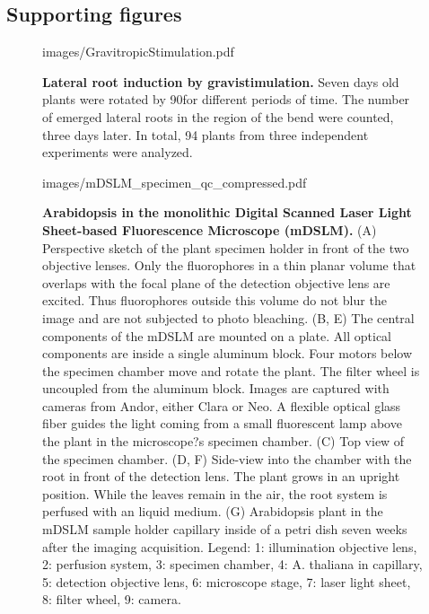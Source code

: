 \documentclass[11pt,a4paper, draft]{article}
\begin{document}
\subsection{Supporting figures}
\setcounter{figure}{0}
\makeatletter 
\renewcommand{\thefigure}{S\@arabic\c@figure}
\makeatother
%
\begin{figure}[htbp]
	\begin{center}
	\begin{overpic}[width=1.\linewidth]{images/GravitropicStimulation.pdf}
	\end{overpic}
\caption[Lateral root induction by gravistimulation.]
{{\bf Lateral root induction by gravistimulation.} Seven days old plants were rotated by 90\degree for different periods of time. The number of emerged lateral roots in the region of the bend were counted, three days later. In total, 94 plants from three independent experiments were analyzed.}
	\label{fig:gravistimul}
	\end{center}
\end{figure}
%
\clearpage
\begin{figure}[htbp]
	\begin{center}
	\begin{overpic}[width=1.\linewidth]{images/mDSLM_specimen_qc_compressed.pdf}
	\end{overpic}
\caption[Arabidopsis in the monolithic Digital Scanned Laser Light Sheet-based Fluorescence Microscope (mDSLM).]
{{\bf Arabidopsis in the monolithic Digital Scanned Laser Light Sheet-based Fluorescence Microscope (mDSLM).} 
(A) Perspective sketch of the plant specimen holder in front of the two objective lenses. Only the fluorophores in a thin planar volume that overlaps with the focal plane of the detection objective lens are excited. Thus fluorophores outside this volume do not blur the image and are not subjected to photo bleaching. (B, E) The central components of the mDSLM are mounted on a plate. All optical components are inside a single aluminum block. Four motors below the specimen chamber move and rotate the plant. The filter wheel is uncoupled from the aluminum block. Images are captured with cameras from Andor, either Clara or Neo. A flexible optical glass fiber guides the light coming from a small fluorescent lamp above the plant in the microscope?s specimen chamber. (C) Top view of the specimen chamber. (D, F) Side-view into the chamber with the root in front of the detection lens. The plant grows in an upright position. While the leaves remain in the air, the root system is perfused with an liquid medium. (G) Arabidopsis plant in the mDSLM sample holder capillary inside of a petri dish seven weeks after the imaging acquisition. Legend: 1: illumination objective lens, 2: perfusion system, 3: specimen chamber, 4: A. thaliana in capillary, 5: detection objective lens, 6: microscope stage, 7: laser light sheet, 8: filter wheel, 9: camera.}
	\label{fig:mDSLM}
	\end{center}
\end{figure}
\end{document}
